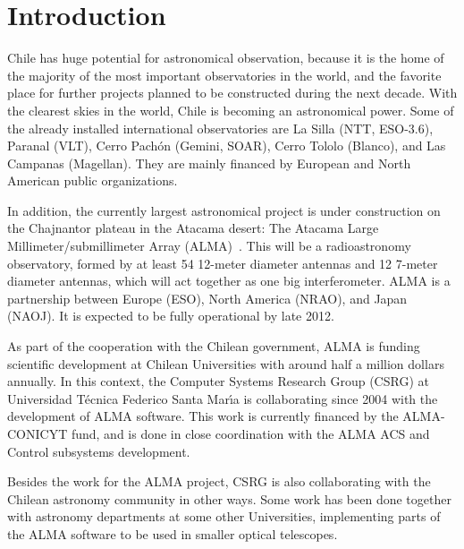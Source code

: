 \chapter{Introduction}
\label{ch:introduction}

Chile has huge potential for astronomical observation,
because it is the home of the majority of the most important observatories
in the world,
and the favorite place for further projects planned
to be constructed during the next decade.
With the clearest skies in the world,
Chile is becoming an astronomical power.
Some of the already installed international observatories are
La Silla (NTT, ESO-3.6),
Paranal (VLT),
Cerro Pach\'on (Gemini, SOAR),
Cerro Tololo (Blanco),
and Las Campanas (Magellan).
They are mainly financed by European and North American public organizations.

In addition,
the currently largest astronomical project
is under construction on the Chajnantor plateau
in the Atacama desert:
The Atacama Large Millimeter/submillimeter Array (ALMA)~\cite{ALMA-WEB}.
This will be a radioastronomy observatory,
formed by at least 54 12-meter diameter antennas and
12 7-meter diameter antennas,
which will act together as one big interferometer.
ALMA is a partnership between Europe (ESO),
North America (NRAO), and Japan (NAOJ).
It is expected to be fully operational by late 2012.

As part of the cooperation with the Chilean government,
ALMA is funding scientific development at Chilean Universities
with around half a million dollars annually.
In this context,
the Computer Systems Research Group (CSRG)
at Universidad T\'ecnica Federico Santa Mar\'\i a
is collaborating since 2004 with the development of ALMA software.
This work is currently financed by the ALMA-CONICYT fund,
and is done in close coordination
with the ALMA ACS and Control subsystems development.

Besides the work for the ALMA project,
CSRG is also collaborating with the Chilean astronomy community in other ways.
Some work has been done together with astronomy departments
at some other Universities,
implementing parts of the ALMA software to be used in smaller optical telescopes.

